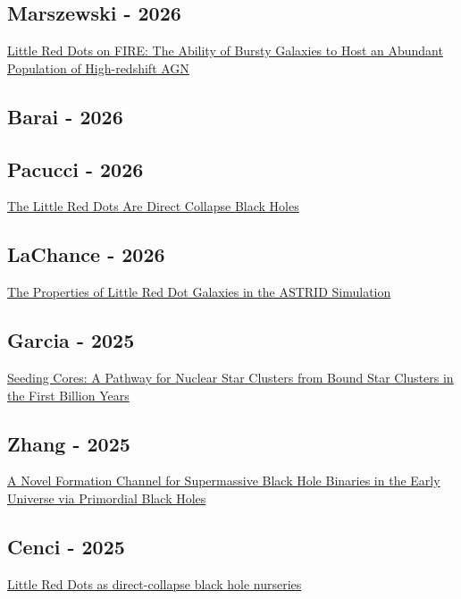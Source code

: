\documentclass{article}
\begin{document}
\subsection*{Marszewski - 2026}
\href{https://ui.adsabs.harvard.edu/abs/2026ApJ..1002L..13M/abstract}{Little Red Dots on FIRE: The Ability of Bursty Galaxies to Host an Abundant Population of High-redshift AGN}

\subsection*{Barai - 2026}

\subsection*{Pacucci - 2026}
\href{https://ui.adsabs.harvard.edu/abs/2026arXiv260114368P/abstract}{The Little Red Dots Are Direct Collapse Black Holes}

\subsection*{LaChance - 2026}
\href{https://ui.adsabs.harvard.edu/abs/2026OJAp....955493L/abstract}{The Properties of Little Red Dot Galaxies in the ASTRID Simulation}

\subsection*{Garcia - 2025}
\href{https://ui.adsabs.harvard.edu/abs/2025OJAp....8E.146G/abstract}{Seeding Cores: A Pathway for Nuclear Star Clusters from Bound Star Clusters in the First Billion Years}

\subsection*{Zhang - 2025}
\href{https://ui.adsabs.harvard.edu/abs/2025ApJ...992..136Z/abstract}{A Novel Formation Channel for Supermassive Black Hole Binaries in the Early Universe via Primordial Black Holes}

\subsection*{Cenci - 2025}
\href{https://ui.adsabs.harvard.edu/abs/2025MNRAS.542.2597C/abstract}{Little Red Dots as direct-collapse black hole nurseries}
\end{document}
